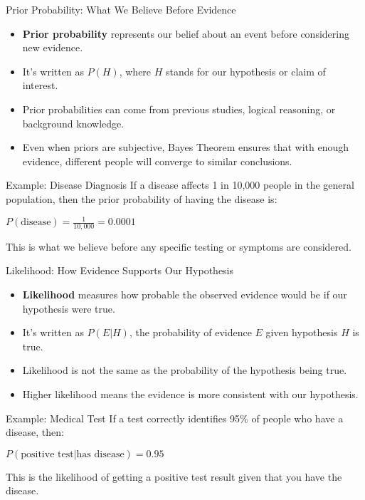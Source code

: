 \documentclass{beamer}
\begin{document}
	\begin{frame}{Prior Probability: What We Believe Before Evidence}
		\begin{itemize}
			\item \textbf{Prior probability} represents our belief about an event before considering new evidence.
			\item It's written as $P(H)$, where $H$ stands for our hypothesis or claim of interest.
			\item Prior probabilities can come from previous studies, logical reasoning, or background knowledge.
			\item Even when priors are subjective, Bayes Theorem ensures that with enough evidence, different people will converge to similar conclusions.
		\end{itemize}
		
		\begin{exampleblock}{Example: Disease Diagnosis}
			If a disease affects 1 in 10,000 people in the general population, then the prior probability of having the disease is:
			
			$P(\text{disease}) = \frac{1}{10,000} = 0.0001$
			
			This is what we believe before any specific testing or symptoms are considered.
		\end{exampleblock}
	\end{frame}
	
	\begin{frame}{Likelihood: How Evidence Supports Our Hypothesis}
		\begin{itemize}
			\item \textbf{Likelihood} measures how probable the observed evidence would be if our hypothesis were true.
			\item It's written as $P(E|H)$, the probability of evidence $E$ given hypothesis $H$ is true.
			\item Likelihood is not the same as the probability of the hypothesis being true.
			\item Higher likelihood means the evidence is more consistent with our hypothesis.
		\end{itemize}
		
		\begin{exampleblock}{Example: Medical Test}
			If a test correctly identifies 95\% of people who have a disease, then:
			
			$P(\text{positive test}|\text{has disease}) = 0.95$
			
			This is the likelihood of getting a positive test result given that you have the disease.
		\end{exampleblock}
	\end{frame}
	
\end{document}
